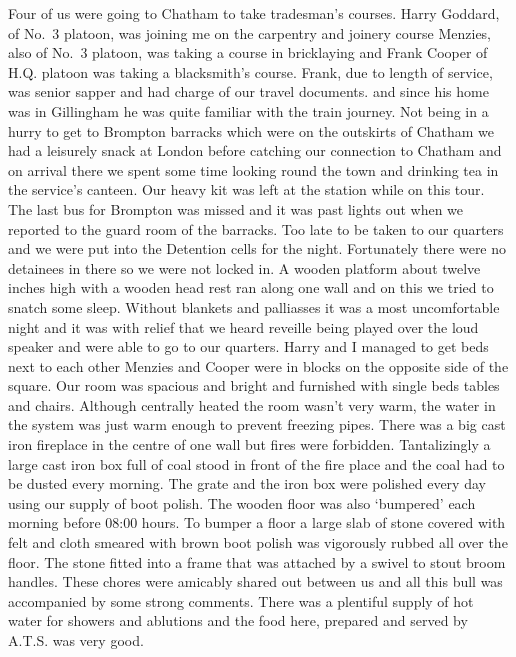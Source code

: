 Four of us were going to Chatham to take tradesman's courses. Harry
Goddard, of No.~3 platoon, was joining me on the carpentry and
joinery course \sapper Menzies, also of No.~3 platoon, was taking a
course in bricklaying and Frank Cooper of H.Q. platoon was taking a
blacksmith's course. Frank, due to length of service, was senior
sapper and had charge of our travel documents. and since his home was
in Gillingham he was quite familiar with the train journey. Not being
in a hurry to get to Brompton barracks which were on the outskirts of
Chatham we had a leisurely snack at London before catching our
connection to Chatham and on arrival there we spent some time looking
round the town and drinking tea in the service's canteen. Our heavy
kit was left at the station while on this tour. The last bus for
Brompton was missed and it was past lights out when we reported to
the guard room of the barracks. Too late to be taken to our quarters
and we were put into the Detention cells for the night. Fortunately
there were no detainees in there so we were not locked in. A wooden
platform about twelve inches high with a wooden head rest ran along
one wall and on this we tried to snatch some sleep. Without blankets
and palliasses it was a most uncomfortable night and it was with
relief that we heard reveille being played over the loud speaker and
were able to go to our quarters. Harry and I managed to get beds next
to each other Menzies and Cooper were in blocks on the opposite side
of the square. Our room was spacious and bright and furnished with
single beds tables and chairs. Although centrally heated the room
wasn't very warm, the water in the system was just warm enough to
prevent freezing pipes. There was a big cast iron fireplace in the
centre of one wall but fires were forbidden. Tantalizingly a large
cast iron box full of coal stood in front of the fire place and the
coal had to be dusted every morning. The grate and the iron box were
polished every day using our supply of boot polish. The wooden floor
was also `bumpered' each morning before 08:00 hours. To bumper a floor
a large slab of stone covered with felt and cloth smeared with brown
boot polish was vigorously rubbed all over the floor. The stone
fitted into a frame that was attached by a swivel to stout broom
handles. These chores were amicably shared out between us and all this
bull was accompanied by some strong comments. There was a plentiful
supply of hot water for showers and ablutions and the food here,
prepared and served by A.T.S. was very good.

